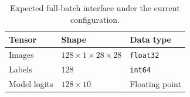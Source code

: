 \begingroup
\setlength{\intextsep}{6pt}
\begin{table}[!htbp]
\centering
\captionsetup{skip=6pt}
\caption{Expected full-batch interface under the current configuration.}
\label{tab:batch}
\begin{tabular}{@{}lll@{}}
\toprule
Tensor & Shape & Data type \\
\midrule
Images & $128\times1\times28\times28$ & \texttt{float32} \\
Labels & $128$ & \texttt{int64} \\
Model logits & $128\times10$ & Floating point \\
\bottomrule
\end{tabular}
\end{table}
\endgroup
